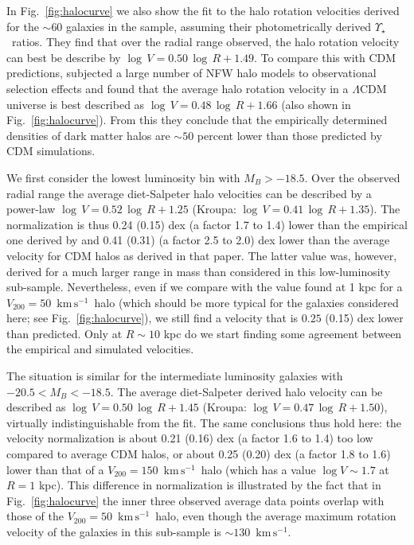 \documentclass[usenatbib,usegraphicx,apjfonts,floatfix]{emulateapj}
\newcommand{\kms}{\ensuremath{\,\mbox{km}\,\mbox{s}^{-1}}}
\newcommand{\MLstar}{\ensuremath{\Upsilon_{\star}}}
\begin{document}
In Fig.~\ref{fig:halocurve} we also show the fit to the halo rotation
velocities derived for the $\sim 60$ galaxies in the \citet{stacy07}
sample, assuming their photometrically derived \MLstar\ ratios. They
find that over the radial range observed, the halo rotation velocity
can best be describe by $\log\,V = 0.50\, \log\,R + 1.49$. To compare
this with CDM predictions, \citet{stacy07} subjected a large number of
NFW halo models to observational selection effects and found that the
average halo rotation velocity in a $\Lambda$CDM universe is best
described as $\log\,V = 0.48\, \log\,R + 1.66$ (also shown in
Fig.~\ref{fig:halocurve}). From this they conclude that the
empirically determined densities of dark matter halos are $\sim 50$
percent lower than those predicted by CDM simulations.


We first consider the lowest luminosity bin with $M_B > -18.5$.  Over
the observed radial range the average diet-Salpeter halo velocities
can be described by a power-law $\log\,V = 0.52\, \log\,R + 1.25$
(Kroupa: $\log\,V = 0.41\, \log\,R + 1.35$).  The normalization is
thus 0.24 (0.15) dex (a factor 1.7 to 1.4) lower than the empirical
one derived by \citet{stacy07} and 0.41 (0.31) (a factor 2.5 to 2.0)
dex lower than the average velocity for CDM halos as derived in that
paper. The latter value was, however, derived for a much larger range
in mass than considered in this low-luminosity
sub-sample. Nevertheless, even if we compare with the value found at 1
kpc for a $V_{200} = 50$ \kms\ halo (which should be more typical for
the galaxies considered here; see Fig.~\ref{fig:halocurve}), we still
find a velocity that is $0.25$ (0.15) dex lower than predicted. Only
at $R\sim 10$ kpc do we start finding some agreement between the
empirical and simulated velocities.

The situation is similar for the intermediate luminosity galaxies with
$-20.5 < M_B < -18.5$. The average diet-Salpeter derived halo velocity
can be described as $\log\,V = 0.50\, \log\,R + 1.45$ (Kroupa:
$\log\,V = 0.47\, \log\,R + 1.50$), virtually indistinguishable from
the \citet{stacy07} fit. The same conclusions thus hold here: the
velocity normalization is about 0.21 (0.16) dex (a factor 1.6 to 1.4)
too low compared to average CDM halos, or about 0.25 (0.20) dex (a
factor 1.8 to 1.6) lower than that of a $V_{200} = 150$ \kms\ halo
(which has a value $\log V \sim 1.7$ at $R=1$ kpc). This difference in
normalization is illustrated by the fact that in
Fig.~\ref{fig:halocurve} the inner three observed average data points
overlap with those of the $V_{200} = 50$ \kms\ halo, even though the
average maximum rotation velocity of the galaxies in this sub-sample
is $\sim 130$ \kms.
\end{document}
